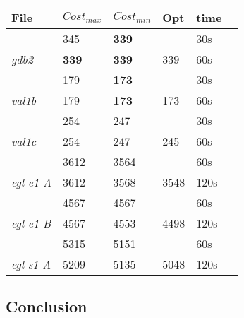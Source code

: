 \documentclass[conference,compsoc]{IEEEtran}
\begin{document}
\begin{minipage}{\linewidth}
	\centering	
	 \label{tab:title} 	
	\begin{tabular}{ C{0.6in} C{0.4in} *4{C{0.4in}}}\toprule[0.4pt]
	    \bf File          & \bf $Cost_{max}$  & \bf $Cost_{min}$ & \bf Opt & \bf time \\\midrule
						  & 345               & \bf 339          &         & 30s      \\
		\textit{gdb2}     & \bf 339           & \bf 339          & 339     & 60s      \\ 
	    \bottomrule[0.25pt]
						  & 179               & \bf 173          &         & 30s      \\
		\textit{val1b}    & 179               & \bf 173          & 173     & 60s      \\
		\bottomrule[0.25pt]
					      & 254               & 247              &         & 30s      \\
		\textit{val1c}    & 254               & 247              & 245	   & 60s      \\			  
		\bottomrule[0.25pt]
						  & 3612              & 3564             &         & 60s      \\
		\textit{egl-e1-A} & 3612              & 3568             & 3548    & 120s     \\
		\bottomrule[0.25pt]
						  & 4567              & 4567             &         & 60s      \\
		\textit{egl-e1-B} & 4567              & 4553             & 4498    & 120s     \\
		\bottomrule[0.25pt]
						  & 5315              & 5151             &         & 60s      \\
		\textit{egl-s1-A} & 5209              & 5135             & 5048    & 120s     \\ 
		\bottomrule[0.25pt]
		\end {tabular}\par
		\bigskip
		
		\centering{}
		
	\end{minipage}

\bigbreak

\par 






\subsection{Conclusion}
\end{document}
